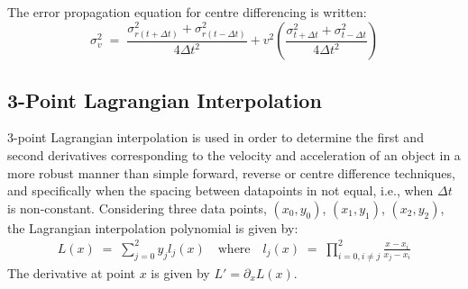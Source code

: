 \documentclass[namedreferences]{SolarPhysics}
\begin{document}
\begin{article}
The error propagation equation for centre differencing is written:
\begin{equation}
\label{eqn_centreerrorprop}
\sigma_v^2 \; = \; \frac{\sigma_{r(t+\Delta t)}^2+\sigma_{r(t-\Delta t)}^2}{4 \Delta t^2} + v^2 \left( \frac{\sigma_{t+\Delta t}^2+\sigma_{t-\Delta t}^2}{4 \Delta t^2} \right) %
\end{equation}


\subsection{3-Point Lagrangian Interpolation}
\label{sect_lagrangian}

3-point Lagrangian interpolation is used in order to determine the first and second derivatives corresponding to the velocity and acceleration of an object in a more robust manner than simple forward, reverse or centre difference techniques, and specifically when the spacing between datapoints in not equal, i.e., when $\Delta t$ is non-constant. Considering three data points, $(x_0, y_0)$, $(x_1, y_1)$, $(x_2, y_2)$, the Lagrangian interpolation polynomial is given by:
\begin{eqnarray}
L(x) \; =\; \sum_{j=0}^2 y_j l_j(x) \quad \mbox{where} \quad
l_j(x) \; =\; \prod_{i=0, i\neq j}^2 \frac{x-x_i}{x_j-x_i} 
\end{eqnarray}
The derivative at point $x$ is given by $L'=\partial_x L(x)$. %

\end{article}
\end{document}
